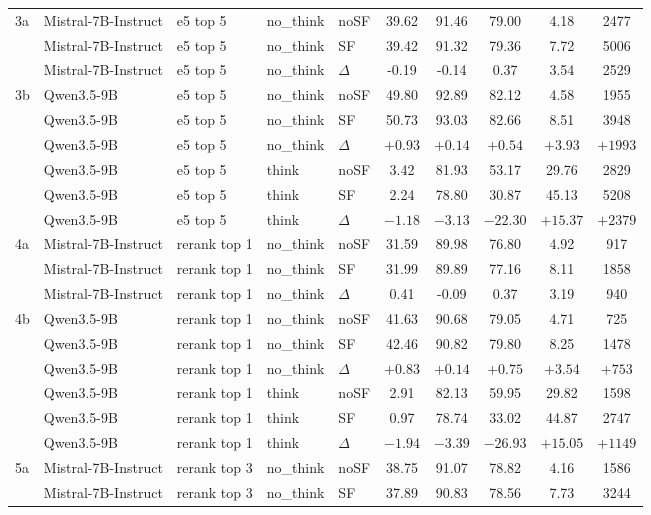 \begin{scriptsize}
\begin{longtable}{l l l l l c c c c c}
\dmidrule
3a & Mistral-7B-Instruct & e5 top 5 & no\_think & noSF & 39.62 & 91.46 & 79.00 & 4.18 & 2477 \\
 & Mistral-7B-Instruct & e5 top 5 & no\_think & SF & 39.42 & 91.32 & 79.36 & 7.72 & 5006 \\
 & Mistral-7B-Instruct & e5 top 5 & no\_think & $\Delta$ & -0.19 & -0.14 & 0.37 & 3.54 & 2529 \\
3b & Qwen3.5-9B & e5 top 5 & no\_think & noSF & 49.80 & 92.89 & 82.12 & 4.58 & 1955 \\
 & Qwen3.5-9B & e5 top 5 & no\_think & SF & 50.73 & 93.03 & 82.66 & 8.51 & 3948 \\
 & Qwen3.5-9B & e5 top 5 & no\_think & $\Delta$ & $+0.93$ & $+0.14$ & $+0.54$ & $+3.93$ & $+1993$ \\
 & Qwen3.5-9B & e5 top 5 & think & noSF & 3.42 & 81.93 & 53.17 & 29.76 & 2829 \\
 & Qwen3.5-9B & e5 top 5 & think & SF & 2.24 & 78.80 & 30.87 & 45.13 & 5208 \\
 & Qwen3.5-9B & e5 top 5 & think & $\Delta$ & $-1.18$ & $-3.13$ & $-22.30$ & $+15.37$ & $+2379$ \\
\dmidrule
4a & Mistral-7B-Instruct & rerank top 1 & no\_think & noSF & 31.59 & 89.98 & 76.80 & 4.92 & 917 \\
 & Mistral-7B-Instruct & rerank top 1 & no\_think & SF & 31.99 & 89.89 & 77.16 & 8.11 & 1858 \\
 & Mistral-7B-Instruct & rerank top 1 & no\_think & $\Delta$ & 0.41 & -0.09 & 0.37 & 3.19 & 940 \\
4b & Qwen3.5-9B & rerank top 1 & no\_think & noSF & 41.63 & 90.68 & 79.05 & 4.71 & 725 \\
 & Qwen3.5-9B & rerank top 1 & no\_think & SF & 42.46 & 90.82 & 79.80 & 8.25 & 1478 \\
 & Qwen3.5-9B & rerank top 1 & no\_think & $\Delta$ & $+0.83$ & $+0.14$ & $+0.75$ & $+3.54$ & $+753$ \\
 & Qwen3.5-9B & rerank top 1 & think & noSF & 2.91 & 82.13 & 59.95 & 29.82 & 1598 \\
 & Qwen3.5-9B & rerank top 1 & think & SF & 0.97 & 78.74 & 33.02 & 44.87 & 2747 \\
 & Qwen3.5-9B & rerank top 1 & think & $\Delta$ & $-1.94$ & $-3.39$ & $-26.93$ & $+15.05$ & $+1149$ \\
\dmidrule
5a & Mistral-7B-Instruct & rerank top 3 & no\_think & noSF & 38.75 & 91.07 & 78.82 & 4.16 & 1586 \\
 & Mistral-7B-Instruct & rerank top 3 & no\_think & SF & 37.89 & 90.83 & 78.56 & 7.73 & 3244 \\

\end{longtable}
\end{scriptsize}
